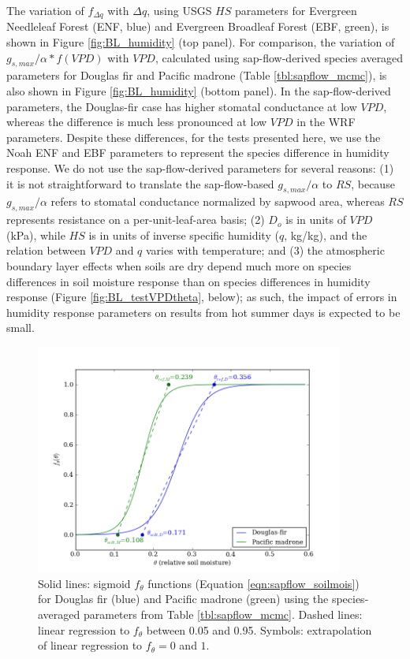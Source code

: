 The variation of $f_{\Delta q}$ with $\Delta q$, using USGS $HS$ parameters for Evergreen Needleleaf Forest (ENF, blue) and Evergreen Broadleaf Forest (EBF, green), is shown in Figure \ref{fig:BL_humidity} (top panel).  For comparison, the variation of $g_{s, max}/\alpha * f(VPD)$ with $VPD$, calculated using sap-flow-derived species averaged parameters for Douglas fir and Pacific madrone (Table \ref{tbl:sapflow_mcmc}), is also shown in Figure \ref{fig:BL_humidity} (bottom panel).  In the sap-flow-derived parameters, the Douglas-fir case has higher stomatal conductance at low $VPD$, whereas the difference is much less pronounced at low $VPD$ in the WRF parameters.  Despite these differences, for the tests presented here, we use the Noah ENF and EBF parameters to represent the species difference in humidity response.  We do not use the sap-flow-derived parameters for several reasons: (1) it is not straightforward to translate the sap-flow-based $g_{s,max}/\alpha$ to $RS$, because $g_{s,max}/\alpha$ refers to stomatal conductance normalized by sapwood area, whereas $RS$ represents resistance on a per-unit-leaf-area basis; (2) $D_o$ is in units of $VPD$ (kPa), while $HS$ is in units of inverse specific humidity ($q$, kg/kg), and the relation between $VPD$ and $q$ varies with temperature; and (3) the atmospheric boundary layer effects when soils are dry depend much more on species differences in soil moisture response than on species differences in humidity response (Figure \ref{fig:BL_testVPDtheta}, below); as such, the impact of errors in humidity response parameters on results from hot summer days is expected to be small.

\begin{figure}[here]
\includegraphics[width=0.9\textwidth]{ch2-BL/figures/theta_params.png}
\caption{Solid lines: sigmoid $f_{\theta}$ functions (Equation \ref{eqn:sapflow_soilmois}) for Douglas fir (blue) and Pacific madrone (green) using the species-averaged parameters from Table \ref{tbl:sapflow_mcmc}.  Dashed lines: linear regression to $f_{\theta}$ between 0.05 and 0.95.  Symbols: extrapolation of linear regression to $f_{\theta}=0$ and $1$.}
\label{fig:BL_FeddesParams}
\end{figure}

